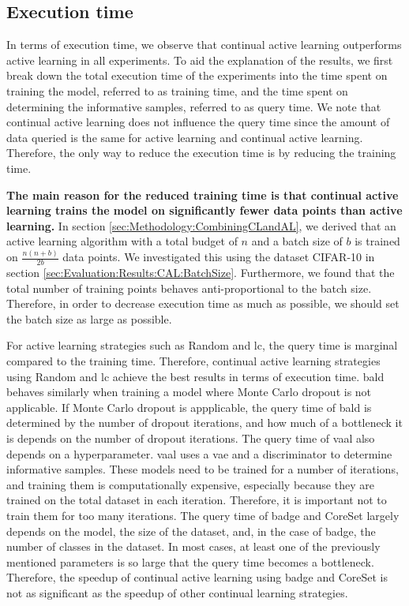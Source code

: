 \subsection{Execution time}
\label{sec:Discussion:ExecutionTime}
In terms of execution time, we observe that continual active learning outperforms active learning in all experiments. To aid the explanation of
the results, we first break down the total execution time of the experiments into the time spent on training the model, referred to as training time,
and the time spent on determining the informative samples, referred to as query time. We note that continual active learning does not influence the 
query time since the amount of data queried is the same for active learning and continual active learning. Therefore, the only way to reduce the
execution time is by reducing the training time. \par
\textbf{The main reason for the reduced training time is that continual active learning trains the model on significantly fewer data points than active learning.}
In section \ref{sec:Methodology:CombiningCLandAL}, we derived that an active learning algorithm with a total budget of $n$ and a batch size of $b$ is
trained on $\frac{n(n+b)}{2b}$ data points. We investigated this using the dataset CIFAR-10 in section \ref{sec:Evaluation:Results:CAL:BatchSize}.
Furthermore, we found that the total number of training points behaves anti-proportional to the batch size. Therefore, in order to decrease execution
time as much as possible, we should set the batch size as large as possible. \par
For active learning strategies such as Random and \gls{lc}, the query time is marginal compared to the training time. Therefore, continual active learning
strategies using Random and \gls{lc} achieve the best results in terms of execution time. \gls{bald} behaves similarly when training a model where Monte
Carlo dropout is not applicable. If Monte Carlo dropout is appplicable, the query time of \gls{bald} is determined by the number of dropout iterations,
and how much of a bottleneck it is depends on the number of dropout iterations. The query time of \gls{vaal} also depends on a hyperparameter.
\gls{vaal} uses a \gls{vae} and a discriminator to determine informative samples. These models need to be trained for a number of iterations, and training
them is computationally expensive, especially because they are trained on the total dataset in each iteration. Therefore, it is important not to train
them for too many iterations. The query time of \gls{badge} and CoreSet largely depends on the model, the size of the dataset, and, in the case of
\gls{badge}, the number of classes in the dataset. In most cases, at least one of the previously mentioned parameters is so large that the query time
becomes a bottleneck. Therefore, the speedup of continual active learning using \gls{badge} and CoreSet is not as significant as the speedup of other
continual learning strategies. \par


